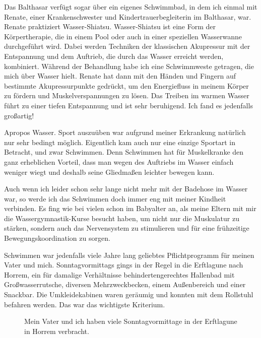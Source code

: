 \documentclass[fontsize=14pt,a4paper,headinclude,DIV=calc,automark]{scrbook}
\begin{document}
Das Balthasar verfügt sogar über ein eigenes Schwimmbad, in dem ich einmal mit Renate, einer Krankenschwester und Kindertrauerbegleiterin im Balthasar, war. Renate praktiziert Wasser-Shiatsu. Wasser-Shiatsu ist eine Form der Körpertherapie, die in einem Pool oder auch in einer speziellen Wasserwanne durchgeführt wird. Dabei werden Techniken der klassischen Akupressur mit der Entspannung und dem Auftrieb, die durch das Wasser erreicht werden, kombiniert. Während der Behandlung habe ich eine Schwimmweste getragen, die mich über Wasser hielt. Renate hat dann mit den Händen und Fingern auf bestimmte Akupressurpunkte gedrückt, um den Energiefluss in meinem Körper zu fördern und Muskelverspannungen zu lösen. Das Treiben im warmen Wasser führt zu einer tiefen Entspannung und ist sehr beruhigend. Ich fand es jedenfalls großartig!

Apropos Wasser. Sport auszuüben war aufgrund meiner Erkrankung natürlich nur sehr bedingt möglich. Eigentlich kam auch nur eine einzige Sportart in Betracht, und zwar Schwimmen. Denn Schwimmen hat für Muskelkranke den ganz erheblichen Vorteil, dass man wegen des Auftriebs im Wasser einfach weniger wiegt und deshalb seine Gliedmaßen leichter bewegen kann.

Auch wenn ich leider schon sehr lange nicht mehr mit der Badehose im Wasser war, so werde ich das Schwimmen doch immer eng mit meiner Kindheit verbinden. Es fing wie bei vielen schon im Babyalter an, als meine Eltern mit mir die Wassergymnastik-Kurse besucht haben, um nicht nur die Muskulatur zu stärken, sondern auch das Nervensystem zu stimulieren und für eine frühzeitige Bewegungskoordination zu sorgen.

Schwimmen war jedenfalls viele Jahre lang geliebtes Pflichtprogramm für meinen Vater und mich. Sonntagvormittags gings in der Regel in die Erftlagune nach Horrem, ein für damalige Verhältnisse behindertengerechtes Hallenbad mit Großwasserrutsche, diversen Mehrzweckbecken, einem Außenbereich und einer Snackbar. Die Umkleidekabinen waren geräumig und konnten mit dem Rollstuhl befahren werden. Das war das wichtigste Kriterium.

\setlength{\fboxsep}{0pt}    %
\setlength{\fboxrule}{0.2pt} %
\begin{figure}[H]
    \raggedright
    \caption{Mein Vater und ich haben viele Sonntagvormittage in der Erftlagune in Horrem verbracht.}
    \label{fig:erftlagune}
\end{figure}
\end{document}

